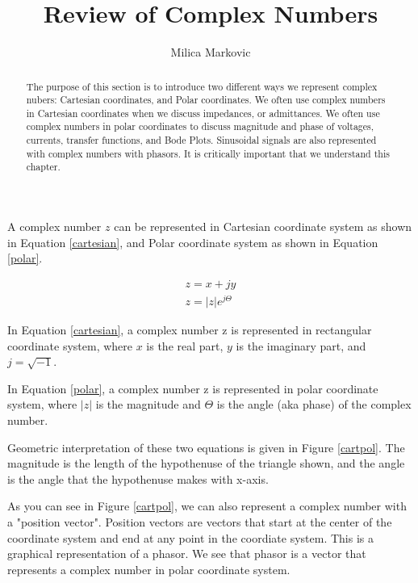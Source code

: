 \documentclass{ximera}
\title{Review of Complex Numbers}
\author{Milica Markovic}
\begin{document}
  
\begin{abstract}  
The purpose of this section is to introduce two different ways we represent complex nubers: Cartesian coordinates, and Polar coordinates. We often use complex numbers in Cartesian coordinates when we discuss impedances, or admittances. We often use complex numbers in polar coordinates to discuss magnitude and phase of voltages, currents, transfer functions, and Bode Plots. Sinusoidal signals are also represented with complex numbers with phasors. It is critically important that we understand this chapter.
\end{abstract}  
\maketitle    
  
\begin{definition}
 A complex number  $z$ can be represented in Cartesian coordinate system as shown in Equation \ref{cartesian}, and  Polar coordinate system as shown in Equation \ref{polar}.




\begin{eqnarray}
z= x + j y \label{cartesian} \\ 
z=|z| e^{j \Theta} \label{polar}
\end{eqnarray}

\end{definition}

In Equation \ref{cartesian}, a complex number z is represented in rectangular coordinate system, where $x$ is the real part, $y$ is the imaginary part, and $j=\sqrt{-1}$. 

In Equation \ref{polar}, a complex number z is represented in polar coordinate system, where  $|z|$ is the magnitude and $\Theta$ is the angle (aka phase) of the complex number.

Geometric interpretation of these two equations is given in Figure \ref{cartpol}. The magnitude is the length of the hypothenuse of the triangle shown, and the angle is the angle that the hypothenuse makes with x-axis. 

 As you can see in Figure \ref{cartpol}, we can also represent a complex number with a "position vector". Position vectors are vectors that start at the center of the coordinate system and end at any point in the coordiate system. This is a graphical representation of a phasor. We see that phasor is a vector that represents a complex number in polar coordinate system. 
\end{document}
